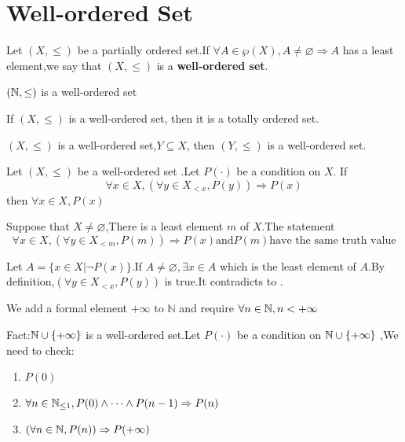 \documentclass{book}
\numberwithin{equation}{section}
\begin{document}
\section{Well-ordered Set}
\begin{definitionenv}
    Let $(X,\le)$ be a partially ordered set.If $\forall A\in \wp(X),A\not=\varnothing\Rightarrow A$ has a least element,we say that $(X,\le)$ is a \textbf{well-ordered set}.
\end{definitionenv}
\begin{axiomenv}
    $(\mathbb{N},\le)$ is a well-ordered set 
\end{axiomenv}
\begin{propositionenv}
    If $(X,\le)$ is a well-ordered set, then it is a totally ordered set.
\end{propositionenv}
\begin{propositionenv}
    $(X,\le)$ is a well-ordered set,$Y\subseteq X$, then $(Y,\le)$ is a well-ordered set. 
\end{propositionenv}
\begin{theoremenv}
    Let $(X,\le)$ be a well-ordered set .Let $P(\cdot)$ be a condition on $X$. If 
    $$\forall x\in X,(\forall y\in X_{<x} ,P(y))\Rightarrow P(x)$$
    then $\forall x\in X,P(x)$
\end{theoremenv}
\begin{remark}
    Suppose that $X\not=\varnothing$,There is a least element $m$ of $X$.The statement
    $$\forall x\in X,(\forall y\in X_{<m} ,P(m))\Rightarrow P(x) \text{and} P(m) \text{have the same truth value}$$
\end{remark}
\begin{proofenv}
    Let $A=\{x\in X|\neg P(x)\}$.If $A\not=\varnothing,\exists x\in A$ which is the least element of $A$.By definition,$(\forall y\in X_{<x} ,P(y))$ is true.It contradicts to .
\end{proofenv}
\begin{remark}
    We add a formal element $+\infty$ to $\mathbb{N}$ and require $\forall n\in \mathbb{N}, n<+\infty$
\end{remark}
Fact:$\mathbb{N} \cup \{+\infty\}$ is a well-ordered set.Let $P(\cdot)$ be a condition on $\mathbb{N} \cup \{+\infty\}$ ,We need to check:
\begin{enumerate}
    \item $P(0)$
    \item $\forall n\in \mathbb{N}_{\leq 1},P(0)\wedge\dots\wedge P(n-1)\Rightarrow P(n)$
    \item $(\forall n \in \mathbb{N},P(n))\Rightarrow P(+\infty)$
\end{enumerate}
\end{document}
